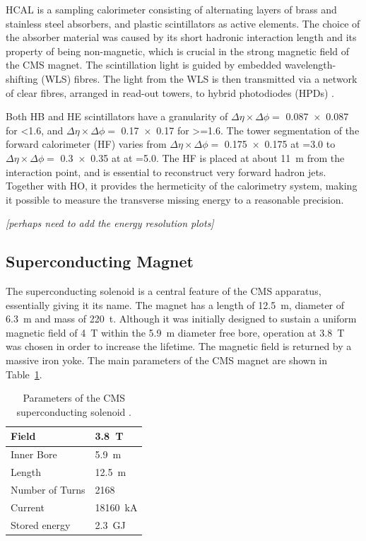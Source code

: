 HCAL is a sampling calorimeter consisting of alternating layers of brass and stainless steel absorbers, and plastic
scintillators as active elements. The choice of the absorber material was caused by its short hadronic interaction
length and its property of being non-magnetic, which is crucial in the strong magnetic field of the CMS magnet. The
scintillation light is guided by embedded wavelength-shifting (WLS) fibres. The light from the WLS is then transmitted
via a network of clear fibres, arranged in read-out towers, to hybrid photodiodes (HPDs) \cite{CMS}.

Both HB and HE scintillators have a granularity of $\Delta \eta \times \Delta \phi =$ \num{0.087x0.087} for \abs\eta
\num{<1.6}, and $\Delta \eta \times \Delta \phi =$ \num{0.17x0.17} for \abs\eta \num{>=1.6}. The tower segmentation of
the forward calorimeter (HF) varies from $\Delta \eta \times \Delta \phi =$ \num{0.175x0.175} at \abs\eta \num{=3.0} to
$\Delta \eta \times \Delta \phi =$ \num{0.3x0.35} at at \abs\eta \num{=5.0}. The HF is placed at about \SI{11}{\metre}
from the interaction point, and is essential to reconstruct very forward hadron jets. Together with HO, it provides the
hermeticity of the calorimetry system, making it possible to measure the transverse missing energy to a reasonable
precision.

\textit{[perhaps need to add the energy resolution plots]}

\subsection{Superconducting Magnet}
The superconducting solenoid is a central feature of the CMS apparatus, essentially giving it its name. The magnet
has a length of \SI{12.5}{\metre}, diameter of \SI{6.3}{\metre} and mass of \SI{220}{\tonne}. Although it was initially
designed to sustain a uniform magnetic field of \SI{4}{\tesla} within the \SI{5.9}{\metre} diameter free bore, operation
at \SI{3.8}{\tesla} was chosen in order to increase the lifetime. The magnetic field is returned by a massive iron yoke.
The main parameters of the CMS magnet are shown in Table~\ref{solenoid_parameters}.

\begin{table}[htbp]
\caption{Parameters of the CMS superconducting solenoid \cite{CMS_TDR1} \cite{CMS_Solenoid}.}
\label{solenoid_parameters}
\begin{center}
\begin{tabular}{|l|l|}
  \hline             
  Field & \SI{3.8}{\tesla} \\
  \hline
  Inner Bore & \SI{5.9}{\metre} \\
  \hline
  Length & \SI{12.5}{\metre} \\
  \hline
  Number of Turns & \num{2168} \\
  \hline
  Current & \SI{18160}{\kilo\ampere} \\
  \hline
  Stored energy & \SI{2.3}{\giga\joule} \\
  \hline
\end{tabular}
\end{center}
\end{table}

